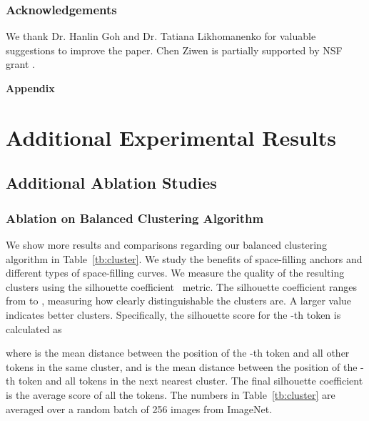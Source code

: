 \documentclass[10pt,twocolumn,letterpaper]{article}
\begin{document}
\subsubsection*{Acknowledgements}
We thank Dr. Hanlin Goh and Dr. Tatiana Likhomanenko for valuable suggestions to improve the paper. Chen Ziwen is partially supported by NSF grant .




{\small


}


\clearpage


\appendix

\noindent                                                                                                               \textbf{\huge Appendix}
\vspace{0.25in}


\section{Additional Experimental Results}
\subsection{Additional Ablation Studies}

\subsubsection{Ablation on Balanced Clustering Algorithm}

We show more results and comparisons regarding our balanced clustering algorithm in Table~\ref{tb:cluster}. We study the benefits of space-filling anchors and different types of space-filling curves. We measure the quality of the resulting clusters using the silhouette coefficient~\cite{silhouettes} metric. The silhouette coefficient ranges from  to , measuring  how clearly distinguishable the clusters are. A larger value indicates better clusters. Specifically, the silhouette score for the -th token is calculated as

where  is the mean distance between the position of the -th token and all other tokens in the same cluster, and  is the mean distance between the position of the -th token and all tokens in the next nearest cluster. The final silhouette coefficient is the average score of all the tokens. The numbers in Table~\ref{tb:cluster} are averaged over a random batch of 256 images from ImageNet.
\end{document}

